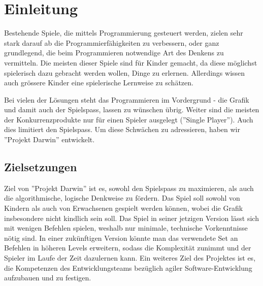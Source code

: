\documentclass[11pt,a4paper,titlepage]{article}
\begin{document}

\newpage

\pagestyle{myheadings}

\section{Einleitung}


Bestehende Spiele, die mittels Programmierung gesteuert werden, zielen sehr stark darauf ab die Programmierfähigkeiten zu verbessern, oder ganz grundlegend, die beim Programmieren notwendige Art des Denkens zu vermitteln.
Die meisten dieser Spiele sind für Kinder gemacht, da diese möglichst spielerisch dazu gebracht werden wollen, Dinge zu erlernen. Allerdings wissen auch grössere Kinder eine spielerische Lernweise zu schätzen.

Bei vielen der Lösungen steht das Programmieren im Vordergrund - die Grafik und damit auch der Spielspass, lassen zu wünschen übrig.
Weiter sind die meisten der Konkurrenzprodukte nur für einen Spieler ausgelegt (''Single Player''). Auch dies limitiert den Spielspass.
Um diese Schwächen zu adressieren, haben wir ''Projekt Darwin'' entwickelt.

\subsection{Zielsetzungen}



Ziel von ''Projekt Darwin'' ist es, sowohl den Spielspass zu maximieren, als auch die algorithmische, logische Denkweise zu fördern. Das Spiel soll sowohl von Kindern als auch von Erwachsenen gespielt werden können, wobei die Grafik insbesondere nicht kindlich sein soll.
Das Spiel in seiner jetzigen Version lässt sich mit wenigen Befehlen spielen, weshalb nur minimale, technische Vorkenntnisse nötig sind.
In einer zukünftigen Version könnte man das verwendete Set an Befehlen in höheren Levels erweitern, sodass die Komplexität zunimmt und der Spieler im Laufe der Zeit dazulernen kann.
Ein weiteres Ziel des Projektes ist es, die Kompetenzen des Entwicklungsteams bezüglich agiler Software-Entwicklung aufzubauen und zu festigen.
\end{document}
